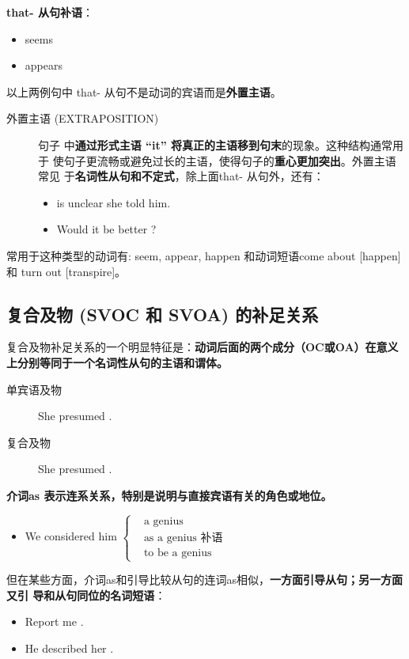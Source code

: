 \textbf{that- 从句补语}：
\begin{itemize}
\item {} seems 
\item {} appears 
\end{itemize}
以上两例句中 that- 从句不是动词的宾语而是\textbf{外置主语}。
\begin{description}
\item[外置主语 (EXTRAPOSITION)]  句子
  中\textbf{通过形式主语 “it” 将真正的主语移到句末}的现象。这种结构通常用于
  使句子更流畅或避免过长的主语，使得句子的\textbf{重心更加突出}。外置主语常见
  于\textbf{名词性从句和不定式}，除上面that- 从句外，还有：
  \begin{itemize}
  \item {} is unclear  she told him.

  \item Would it be better ?
  \end{itemize}
\end{description}
常用于这种类型的动词有: seem, appear, happen 和动词短语come about
[happen]和 turn out [transpire]。

\subsection{复合及物 (SVOC 和 SVOA) 的补足关系}

复合及物补足关系的一个明显特征是：\textbf{动词后面的两个成分（OC或OA）在意义
  上分别等同于一个名词性从句的主语和谓体。}
\begin{description}
\item[单宾语及物] She presumed .
\item[复合及物] She presumed .
\end{description}

\textbf{介词as 表示连系关系，特别是说明与直接宾语有关的角色或地位。}
\begin{itemize}
\item We considered him $ \left\{
    \begin{aligned}
      &\text{a genius} \\
      &\text{as a genius 补语} \\
      &\text{to be a genius}
    \end{aligned}
  \right. $
\end{itemize}
但在某些方面，介词as和引导比较从句的连词as相似，\textbf{一方面引导从句；另一方面又引
导和从句同位的名词短语}：
\begin{itemize}
\item Report me .

\item He described her .
\end{itemize}


